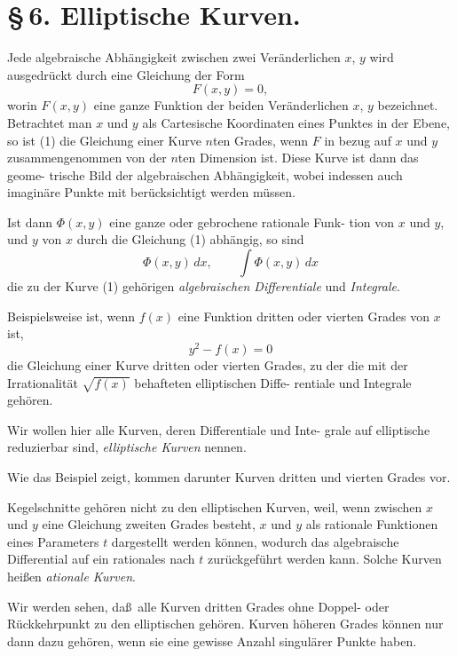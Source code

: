 \documentclass[12pt,a4paper]{book}
\theoremstyle{definition}
\begin{document}
\section*{\S\,6. Elliptische Kurven.}

Jede algebraische Abh\"angigkeit zwischen zwei Ver\"anderlichen
$x$, $y$ wird ausgedr\"uckt durch eine Gleichung der Form
\begin{equation}
F(x,y) = 0, \tag{1}
\end{equation}
worin $F(x,y)$ eine ganze Funktion der beiden Ver\"anderlichen $x$, $y$
bezeichnet. Betrachtet man $x$ und $y$ als Cartesische Koordinaten
eines Punktes in der Ebene, so ist (1) die Gleichung einer Kurve
$n$ten Grades, wenn $F$ in bezug auf $x$ und $y$ zusammengenommen
von der $n$ten Dimension ist. Diese Kurve ist dann das geome-
trische Bild der algebraischen Abh\"angigkeit, wobei indessen auch
imagin\"are Punkte mit ber\"ucksichtigt werden m\"ussen.

Ist dann $\Phi(x,y)$ eine ganze oder gebrochene rationale Funk-
tion von $x$ und $y$, und $y$ von $x$ durch die Gleichung (1) abh\"angig,
so sind
\begin{equation}
\Phi(x,y)\,dx, \qquad \int \Phi(x,y)\,dx \tag{2}
\end{equation}
die zu der Kurve (1) geh\"origen \emph{algebraischen Differentiale}
und \emph{Integrale}.

Beispielsweise ist, wenn $f(x)$ eine Funktion dritten oder
vierten Grades von $x$ ist,
\[
y^2 - f(x) = 0
\]
die Gleichung einer Kurve dritten oder vierten Grades, zu der
die mit der Irrationalit\"at $\sqrt{f(x)}$ behafteten elliptischen Diffe-
rentiale und Integrale geh\"oren.

Wir wollen hier alle Kurven, deren Differentiale und Inte-
grale auf elliptische reduzierbar sind, \emph{elliptische Kurven} nennen.

Wie das Beispiel zeigt, kommen darunter Kurven dritten
und vierten Grades vor.

Kegelschnitte geh\"oren nicht zu den elliptischen Kurven, weil,
wenn zwischen $x$ und $y$ eine Gleichung zweiten Grades besteht,
$x$ und $y$ als rationale Funktionen eines Parameters $t$ dargestellt
werden k\"onnen, wodurch das algebraische Differential auf ein
rationales nach $t$ zur\"uckgef\"uhrt werden kann. Solche Kurven
hei\ss en \emph{ationale Kurven}.

Wir werden sehen, da\ss\ alle Kurven dritten Grades ohne
Doppel- oder R\"uckkehrpunkt zu den elliptischen geh\"oren. Kurven
h\"oheren Grades k\"onnen nur dann dazu geh\"oren, wenn sie eine
gewisse Anzahl singul\"arer Punkte haben.
\end{document}
